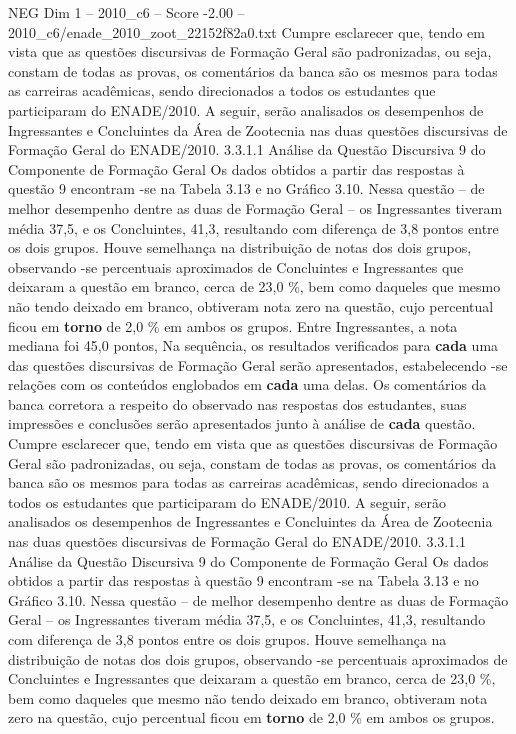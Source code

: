 \begin{textsample}{NEG Dim 1 – 2010\_c6 – Score -2.00 – 2010\_c6/enade\_2010\_zoot\_22152f82a0.txt}
Cumpre esclarecer que, tendo em vista que as questões discursivas de Formação Geral são padronizadas, ou seja, constam de todas as provas, os comentários da banca são os mesmos para todas as carreiras acadêmicas, sendo direcionados a todos os estudantes que participaram do ENADE/2010.
A seguir, serão analisados os desempenhos de Ingressantes e Concluintes da Área de Zootecnia nas duas questões discursivas de Formação Geral do ENADE/2010. 3.3.1.1 Análise da Questão Discursiva 9 do Componente de Formação Geral Os dados obtidos a partir das respostas à questão 9 encontram -se na Tabela 3.13 e no Gráfico 3.10.
Nessa questão – de melhor desempenho dentre as duas de Formação Geral – os Ingressantes tiveram média 37,5, e os Concluintes, 41,3, resultando com diferença de 3,8 pontos entre os dois grupos.
Houve semelhança na distribuição de notas dos dois grupos, observando -se percentuais aproximados de Concluintes e Ingressantes que deixaram a questão em branco, cerca de 23,0 \%, bem como daqueles que mesmo não tendo deixado em branco, obtiveram nota zero na questão, cujo percentual ficou em \textbf{torno} de 2,0 \% em ambos os grupos.
Entre Ingressantes, a nota mediana foi 45,0 pontos, Na sequência, os resultados verificados para \textbf{cada} uma das questões discursivas de Formação Geral serão apresentados, estabelecendo -se relações com os conteúdos englobados em \textbf{cada} uma delas.
Os comentários da banca corretora a respeito do observado nas respostas dos estudantes, suas impressões e conclusões serão apresentados junto à análise de \textbf{cada} questão.
Cumpre esclarecer que, tendo em vista que as questões discursivas de Formação Geral são padronizadas, ou seja, constam de todas as provas, os comentários da banca são os mesmos para todas as carreiras acadêmicas, sendo direcionados a todos os estudantes que participaram do ENADE/2010.
A seguir, serão analisados os desempenhos de Ingressantes e Concluintes da Área de Zootecnia nas duas questões discursivas de Formação Geral do ENADE/2010. 3.3.1.1 Análise da Questão Discursiva 9 do Componente de Formação Geral Os dados obtidos a partir das respostas à questão 9 encontram -se na Tabela 3.13 e no Gráfico 3.10.
Nessa questão – de melhor desempenho dentre as duas de Formação Geral – os Ingressantes tiveram média 37,5, e os Concluintes, 41,3, resultando com diferença de 3,8 pontos entre os dois grupos.
Houve semelhança na distribuição de notas dos dois grupos, observando -se percentuais aproximados de Concluintes e Ingressantes que deixaram a questão em branco, cerca de 23,0 \%, bem como daqueles que mesmo não tendo deixado em branco, obtiveram nota zero na questão, cujo percentual ficou em \textbf{torno} de 2,0 \% em ambos os grupos.

\end{textsample}
